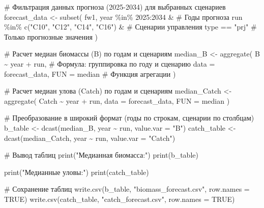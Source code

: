 \documentclass[
  letterpaper,
  DIV=11,
  numbers=noendperiod]{scrreprt}
\newenvironment{Shaded}{\begin{snugshade}}{\end{snugshade}}
\newcommand{\AttributeTok}[1]{\textcolor[rgb]{0.40,0.45,0.13}{#1}}
\newcommand{\CommentTok}[1]{\textcolor[rgb]{0.37,0.37,0.37}{#1}}
\newcommand{\ConstantTok}[1]{\textcolor[rgb]{0.56,0.35,0.01}{#1}}
\newcommand{\DecValTok}[1]{\textcolor[rgb]{0.68,0.00,0.00}{#1}}
\newcommand{\FunctionTok}[1]{\textcolor[rgb]{0.28,0.35,0.67}{#1}}
\newcommand{\NormalTok}[1]{\textcolor[rgb]{0.00,0.23,0.31}{#1}}
\newcommand{\OtherTok}[1]{\textcolor[rgb]{0.00,0.23,0.31}{#1}}
\newcommand{\SpecialCharTok}[1]{\textcolor[rgb]{0.37,0.37,0.37}{#1}}
\newcommand{\StringTok}[1]{\textcolor[rgb]{0.13,0.47,0.30}{#1}}
\begin{document}
\begin{Shaded}
\begin{Highlighting}[]
\CommentTok{\# Фильтрация данных прогноза (2025{-}2034) для выбранных сценариев}
\NormalTok{forecast\_data }\OtherTok{\textless{}{-}} \FunctionTok{subset}\NormalTok{(}
\NormalTok{  fw1, }
\NormalTok{  year }\SpecialCharTok{\%in\%} \DecValTok{2025}\SpecialCharTok{:}\DecValTok{2034} \SpecialCharTok{\&}    \CommentTok{\# Годы прогноза}
\NormalTok{    run }\SpecialCharTok{\%in\%} \FunctionTok{c}\NormalTok{(}\StringTok{"C10"}\NormalTok{, }\StringTok{"C12"}\NormalTok{, }\StringTok{"C14"}\NormalTok{, }\StringTok{"C16"}\NormalTok{) }\SpecialCharTok{\&} \CommentTok{\# Сценарии управления}
\NormalTok{    type }\SpecialCharTok{==} \StringTok{"prj"}           \CommentTok{\# Только прогнозные значения}
\NormalTok{)}

\CommentTok{\# Расчет медиан биомассы (B) по годам и сценариям}
\NormalTok{median\_B }\OtherTok{\textless{}{-}} \FunctionTok{aggregate}\NormalTok{(}
\NormalTok{  B }\SpecialCharTok{\textasciitilde{}}\NormalTok{ year }\SpecialCharTok{+}\NormalTok{ run,          }\CommentTok{\# Формула: группировка по году и сценарию}
  \AttributeTok{data =}\NormalTok{ forecast\_data, }
  \AttributeTok{FUN =}\NormalTok{ median             }\CommentTok{\# Функция агрегации}
\NormalTok{)}

\CommentTok{\# Расчет медиан улова (Catch) по годам и сценариям}
\NormalTok{median\_Catch }\OtherTok{\textless{}{-}} \FunctionTok{aggregate}\NormalTok{(}
\NormalTok{  Catch }\SpecialCharTok{\textasciitilde{}}\NormalTok{ year }\SpecialCharTok{+}\NormalTok{ run, }
  \AttributeTok{data =}\NormalTok{ forecast\_data, }
  \AttributeTok{FUN =}\NormalTok{ median}
\NormalTok{)}

\CommentTok{\# Преобразование в широкий формат (годы по строкам, сценарии по столбцам)}
\NormalTok{b\_table }\OtherTok{\textless{}{-}} \FunctionTok{dcast}\NormalTok{(median\_B, year }\SpecialCharTok{\textasciitilde{}}\NormalTok{ run, }\AttributeTok{value.var =} \StringTok{"B"}\NormalTok{)}
\NormalTok{catch\_table }\OtherTok{\textless{}{-}} \FunctionTok{dcast}\NormalTok{(median\_Catch, year }\SpecialCharTok{\textasciitilde{}}\NormalTok{ run, }\AttributeTok{value.var =} \StringTok{"Catch"}\NormalTok{)}

\CommentTok{\# Вывод таблиц}
\FunctionTok{print}\NormalTok{(}\StringTok{"Медианная биомасса:"}\NormalTok{)}
\FunctionTok{print}\NormalTok{(b\_table)}

\FunctionTok{print}\NormalTok{(}\StringTok{"Медианные уловы:"}\NormalTok{)}
\FunctionTok{print}\NormalTok{(catch\_table)}

\CommentTok{\# Сохранение таблиц}
\FunctionTok{write.csv}\NormalTok{(b\_table, }\StringTok{"biomass\_forecast.csv"}\NormalTok{, }\AttributeTok{row.names =} \ConstantTok{TRUE}\NormalTok{)}
\FunctionTok{write.csv}\NormalTok{(catch\_table, }\StringTok{"catch\_forecast.csv"}\NormalTok{, }\AttributeTok{row.names =} \ConstantTok{TRUE}\NormalTok{)}
\end{Highlighting}
\end{Shaded}
\end{document}
